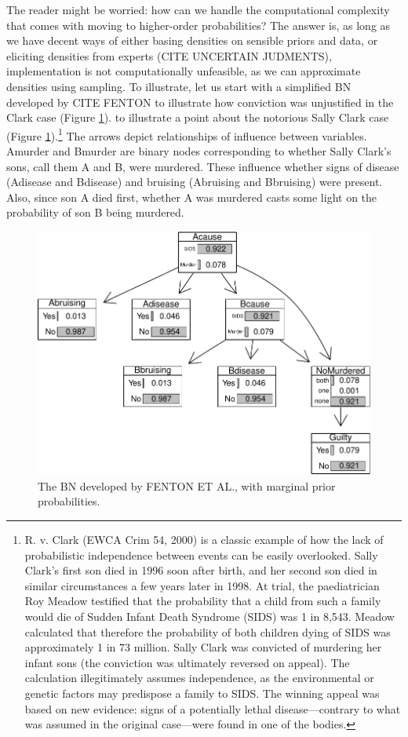 \documentclass[
  10pt,
  dvipsnames,enabledeprecatedfontcommands]{scrartcl}
\begin{document}
The reader might be worried: how can we handle the computational
complexity that comes with moving to higher-order probabilities? The
answer is, as long as we have decent ways of either basing densities on
sensible priors and data, or eliciting densities from experts (CITE
UNCERTAIN JUDMENTS), implementation is not computationally unfeasible,
as we can approximate densities using sampling. To illustrate, let us
start with a simplified BN developed by CITE FENTON to illustrate how
conviction was unjustified in the Clark case (Figure
\ref{fig:scBNplot}). to illustrate a point about the notorious Sally
Clark case (Figure \ref{fig:scBNplot}).\footnote{R. v. Clark (EWCA Crim
  54, 2000) is a classic example of how the lack of probabilistic
  independence between events can be easily overlooked. Sally Clark's
  first son died in 1996 soon after birth, and her second son died in
  similar circumstances a few years later in 1998. At trial, the
  paediatrician Roy Meadow testified that the probability that a child
  from such a family would die of Sudden Infant Death Syndrome (SIDS)
  was 1 in 8,543. Meadow calculated that therefore the probability of
  both children dying of SIDS was approximately 1 in 73 million. Sally
  Clark was convicted of murdering her infant sons (the conviction was
  ultimately reversed on appeal). The calculation illegitimately assumes
  independence, as the environmental or genetic factors may predispose a
  family to SIDS. The winning appeal was based on new evidence: signs of
  a potentially lethal disease---contrary to what was assumed in the
  original case---were found in one of the bodies.} The arrows depict
relationships of influence between variables. \textsf{Amurder} and
\textsf{Bmurder} are binary nodes corresponding to whether Sally Clark's
sons, call them A and B, were murdered. These influence whether signs of
disease (\textsf{Adisease} and \textsf{Bdisease}) and bruising
(\textsf{Abruising} and \textsf{Bbruising}) were present. Also, since
son A died first, whether A was murdered casts some light on the
probability of son B being murdered.

\begin{figure}[H]

\begin{center}\includegraphics[width=0.8\linewidth]{chapter-outline_files/figure-latex/scBNplot2-1} \end{center}
\caption{The BN developed by FENTON ET AL., with marginal prior probabilities.}
\label{fig:scBNplot}
\end{figure}
\end{document}
